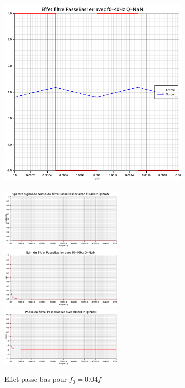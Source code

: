 \documentclass{article}
\begin{document}
\begin{figure}[H]
  \begin{minipage}{0.6\textwidth}
      \centering
      \includegraphics[width=25em]{images/creneau/bas/0.04/signals.png}
  \end{minipage}
  \begin{minipage}{0.3\textwidth}
      \centering
      \includegraphics[width=16em]{images/creneau/bas/0.04/fft_out.png}
      \vfill
      \includegraphics[width=16em]{images/creneau/bas/0.04/gain.png}
      \vfill
      \includegraphics[width=16em]{images/creneau/bas/0.04/phase.png}
  \end{minipage}
  \caption{Effet passe bas pour $f_0=0.04f$}
\end{figure}
\end{document}
